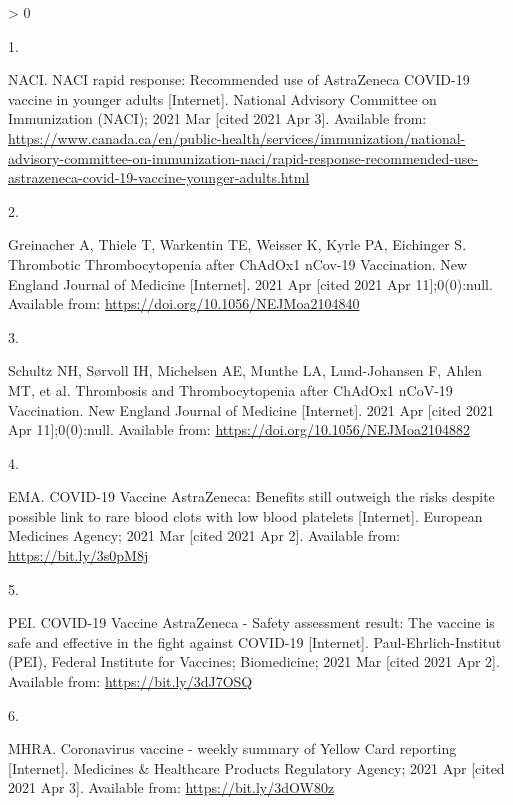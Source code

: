 \documentclass[]{elsarticle} %
\newlength{\csllabelwidth}
\newlength{\cslhangindent}
\newenvironment{CSLReferences}[3] %
 {%
  \setlength{\parindent}{0pt}
  \ifodd #1 \everypar{\setlength{\hangindent}{\cslhangindent}}\ignorespaces\fi
  \ifnum #2 > 0
  \setlength{\parskip}{#2\baselineskip}
  \fi
 }%
 {}
\newcommand{\CSLLeftMargin}[1]{\parbox[t]{\csllabelwidth}{#1}}
\newcommand{\CSLRightInline}[1]{\parbox[t]{\linewidth - \csllabelwidth}{#1}}
\begin{document}
\hypertarget{refs}{}
\begin{CSLReferences}{0}{0}
\leavevmode\hypertarget{ref-naci_naci_2021}{}%
\CSLLeftMargin{1. }
\CSLRightInline{NACI. {NACI} rapid response: {Recommended} use of
{AstraZeneca} {COVID}-19 vaccine in younger adults {[}Internet{]}.
National Advisory Committee on Immunization (NACI); 2021 Mar {[}cited
2021 Apr 3{]}. Available from:
\url{https://www.canada.ca/en/public-health/services/immunization/national-advisory-committee-on-immunization-naci/rapid-response-recommended-use-astrazeneca-covid-19-vaccine-younger-adults.html}}

\leavevmode\hypertarget{ref-greinacher_thrombotic_2021}{}%
\CSLLeftMargin{2. }
\CSLRightInline{Greinacher A, Thiele T, Warkentin TE, Weisser K, Kyrle
PA, Eichinger S. Thrombotic {Thrombocytopenia} after {ChAdOx1} {nCov}-19
{Vaccination}. New England Journal of Medicine {[}Internet{]}. 2021 Apr
{[}cited 2021 Apr 11{]};0(0):null. Available from:
\url{https://doi.org/10.1056/NEJMoa2104840}}

\leavevmode\hypertarget{ref-schultz_thrombosis_2021}{}%
\CSLLeftMargin{3. }
\CSLRightInline{Schultz NH, Sørvoll IH, Michelsen AE, Munthe LA,
Lund-Johansen F, Ahlen MT, et al. Thrombosis and {Thrombocytopenia}
after {ChAdOx1} {nCoV}-19 {Vaccination}. New England Journal of Medicine
{[}Internet{]}. 2021 Apr {[}cited 2021 Apr 11{]};0(0):null. Available
from: \url{https://doi.org/10.1056/NEJMoa2104882}}

\leavevmode\hypertarget{ref-ema_covid-19_2021}{}%
\CSLLeftMargin{4. }
\CSLRightInline{EMA. {COVID}-19 {Vaccine} {AstraZeneca}: Benefits still
outweigh the risks despite possible link to rare blood clots with low
blood platelets {[}Internet{]}. European Medicines Agency; 2021 Mar
{[}cited 2021 Apr 2{]}. Available from: \url{https://bit.ly/3s0pM8j}}

\leavevmode\hypertarget{ref-pei_covid-19_2021}{}%
\CSLLeftMargin{5. }
\CSLRightInline{PEI. {COVID}-19 {Vaccine} {AstraZeneca} - {Safety}
assessment result: {The} vaccine is safe and effective in the fight
against {COVID}-19 {[}Internet{]}. Paul-Ehrlich-Institut (PEI), Federal
Institute for Vaccines; Biomedicine; 2021 Mar {[}cited 2021 Apr 2{]}.
Available from: \url{https://bit.ly/3dJ7OSQ}}

\leavevmode\hypertarget{ref-mhra_coronavirus_2021}{}%
\CSLLeftMargin{6. }
\CSLRightInline{MHRA. Coronavirus vaccine - weekly summary of {Yellow}
{Card} reporting {[}Internet{]}. Medicines \& Healthcare Products
Regulatory Agency; 2021 Apr {[}cited 2021 Apr 3{]}. Available from:
\url{https://bit.ly/3dOW80z}}


\end{CSLReferences}
\end{document}
